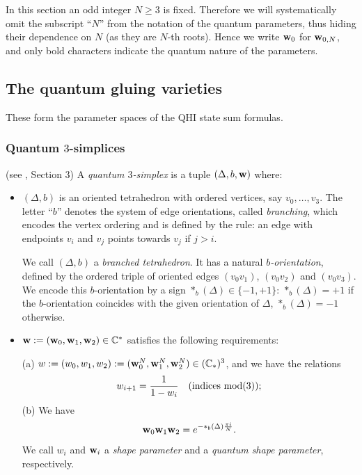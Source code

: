 \documentclass[11pt]{amsart}
\newcommand{\mc}{\mathbb{C}}
\newcommand{\bw}{{\bf w}}
\begin{document}
In this section an odd integer $N\geq 3$ is fixed. Therefore we will systematically omit the subscript ``$N$'' from the notation of the quantum parameters, thus hiding their dependence on $N$ (as they are $N$-th roots). Hence we write $\bw_0$ for $\bw_{0,N}$, and only bold characters indicate the quantum nature of the parameters.

\subsection{The quantum gluing varieties} \label{QGVsec} These form the parameter spaces of the QHI state sum formulas. 

\subsubsection{Quantum $3$-simplices} (see \cite{AGT}, Section 3)\label{sec:q3Delta} A {\it quantum $3$-simplex} is a tuple $(\Delta,b,\bw)$ where:
\begin{itemize}
\item $(\Delta,b)$ is an oriented tetrahedron with ordered vertices, say $v_0,\ldots,v_3$. The letter ``$b$'' denotes the system of edge orientations, called {\it branching}, which encodes the vertex ordering and is defined by the rule: an edge with endpoints $v_i$ and $v_j$ points towards $v_j$ if $j>i$. 

\noindent We call $(\Delta,b)$ a {\it branched tetrahedron}. It has a natural {\it $b$-orientation}, defined by the ordered triple of oriented edges $(v_0v_1)$, $(v_0v_2)$ and $(v_0v_3)$. We encode this $b$-orientation by a sign $*_b(\Delta)\in \{-1,+1\}$: $*_b(\Delta)=+1$ if the $b$-orientation coincides with the given orientation of $\Delta$, $*_b(\Delta)=-1$ otherwise.
\item $\bw:=(\bw_0,\bw_1,\bw_2)\in \mc^*$ satisfies the following requirements: 
\smallskip

\noindent (a) $w:=(w_0,w_1,w_2) := (\bw_0^N,\bw_1^N,\bw_2^N)\in (\mc_*)^3$, and we have the relations
\begin{equation}\label{cyclicshapeoct25}
w_{i+1}=\frac{1}{1-w_i}\quad {\rm (indices\ mod}(3));
\end{equation}
 \noindent (b) We have
 \begin{equation}\label{tetrelbasique}
 \bw_0\bw_1\bw_2 =e^{-*_b(\Delta)\frac{\pi i}{N}}.
 \end{equation}
 We call $w_i$ and $\bw_i$ a {\it shape parameter} and a {\it quantum shape parameter}, respectively.
 \end{itemize} 
 
\end{document}
